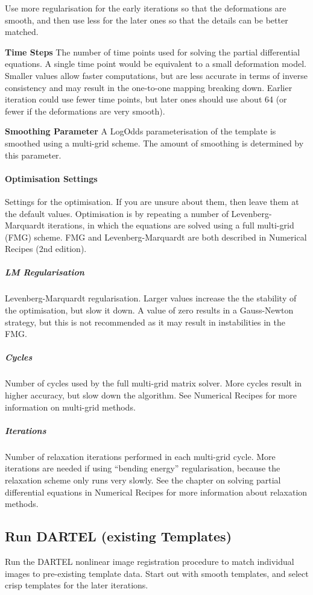 Use more regularisation for the early iterations so that the deformations are smooth, and then use less for the later ones so that the details can be better matched.


\textbf{Time Steps}
The number of time points used for solving the partial differential equations.  A single time point would be equivalent to a small deformation model. Smaller values allow faster computations, but are less accurate in terms of inverse consistency and may result in the one-to-one mapping breaking down.  Earlier iteration could use fewer time points, but later ones should use about 64 (or fewer if the deformations are very smooth).


\textbf{Smoothing Parameter}
A LogOdds parameterisation of the template is smoothed using a multi-grid scheme.  The amount of smoothing is determined by this parameter.


\paragraph{Optimisation Settings}
Settings for the optimisation.  If you are unsure about them, then leave them at the default values.  Optimisation is by repeating a number of Levenberg-Marquardt iterations, in which the equations are solved using a full multi-grid (FMG) scheme. FMG and Levenberg-Marquardt are both described in Numerical Recipes (2nd edition).


\subparagraph{LM Regularisation}
Levenberg-Marquardt regularisation.  Larger values increase the the stability of the optimisation, but slow it down.  A value of zero results in a Gauss-Newton strategy, but this is not recommended as it may result in instabilities in the FMG.


\subparagraph{Cycles}
Number of cycles used by the full multi-grid matrix solver. More cycles result in higher accuracy, but slow down the algorithm. See Numerical Recipes for more information on multi-grid methods.


\subparagraph{Iterations}
Number of relaxation iterations performed in each multi-grid cycle. More iterations are needed if using ``bending energy'' regularisation, because the relaxation scheme only runs very slowly. See the chapter on solving partial differential equations in Numerical Recipes for more information about relaxation methods.


\subsection{Run DARTEL (existing Templates)}
Run the DARTEL nonlinear image registration procedure to match individual images to pre-existing template data. Start out with smooth templates, and select crisp templates for the later iterations.


